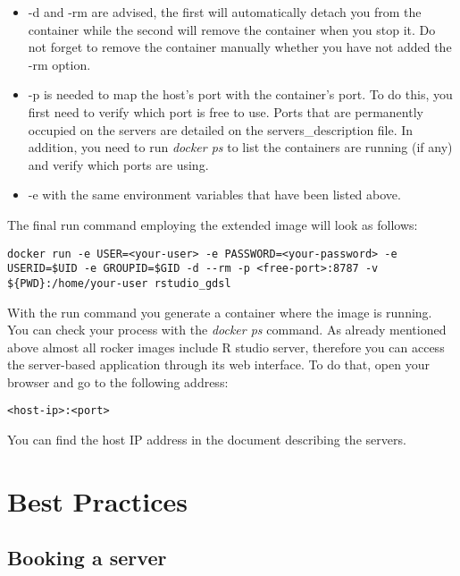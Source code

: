 \documentclass[
]{book}
\providecommand{\tightlist}{%
  \setlength{\itemsep}{0pt}\setlength{\parskip}{0pt}}
\begin{document}
\begin{itemize}
\tightlist
\item
  -d and -rm are advised, the first will automatically detach you from the container while the second will remove the container when you stop it. Do not forget to remove the container manually whether you have not added the -rm option.
\item
  -p is needed to map the host's port with the container's port. To do this, you first need to verify which port is free to use. Ports that are permanently occupied on the servers are detailed on the servers\_description file. In addition, you need to run \emph{docker ps} to list the containers are running (if any) and verify which ports are using.
\item
  -e with the same environment variables that have been listed above.
\end{itemize}

The final run command employing the extended image will look as follows:

\begin{verbatim}
docker run -e USER=<your-user> -e PASSWORD=<your-password> -e USERID=$UID -e GROUPID=$GID -d --rm -p <free-port>:8787 -v ${PWD}:/home/your-user rstudio_gdsl
\end{verbatim}

With the run command you generate a container where the image is running.
You can check your process with the \emph{docker ps} command. As already mentioned above almost all rocker images include R studio server, therefore you can access the server-based application through its web interface. To do that, open your browser and go to the following address:

\begin{verbatim}
<host-ip>:<port>
\end{verbatim}

You can find the host IP address in the document describing the servers.

\hypertarget{best-practices}{%
\chapter{Best Practices}\label{best-practices}}

\hypertarget{booking-a-server}{%
\section{Booking a server}\label{booking-a-server}}
\end{document}
